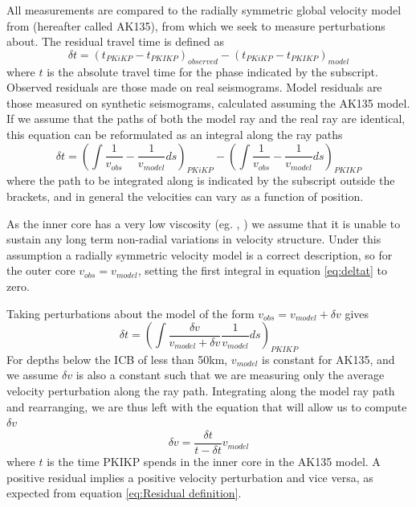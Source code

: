 \documentclass[11pt,a4paper]{article}
\begin{document}
All measurements are compared to the radially symmetric global velocity model from \cite{Kennett1995b} (hereafter called AK135), from which we seek to measure perturbations about. The residual travel time is defined as
\begin{equation}
	\delta t = \left ( t_{PKiKP} - t_{PKIKP} \right )_{observed} -  \left ( t_{PKiKP} - t_{PKIKP} \right )_{model}
	\label{eq:Residual definition}
\end{equation}
where $t$ is the absolute travel time for the phase indicated by the subscript. Observed residuals are those made on real seismograms. Model residuals are those measured on synthetic seismograms, calculated assuming the AK135 model. If we assume that the paths of both the model ray and the real ray are identical, this equation can be reformulated as an integral along the ray paths
\begin{equation}
		\delta t = \left (  \int \frac{1}{v_{obs}} - \frac{1}{v_{model}} ds  \right )_{PKiKP} - \left (  \int \frac{1}{v_{obs}} - \frac{1}{v_{model}} ds \right )_{PKIKP}
		\label{eq:deltat}
\end{equation}
where the path to be integrated along is indicated by the subscript outside the brackets, and in general the velocities can vary as a function of position.

As the inner core has a very low viscosity (eg. \cite{Wijs1998}, \cite{Zhang2000}) we assume that it is unable to sustain any long term non-radial variations in velocity structure. Under this assumption a radially symmetric velocity model is a correct description, so for the outer core $v_{obs} = v_{model}$, setting the first integral in equation \eqref{eq:deltat} to zero.

Taking perturbations about the model of the form $v_{obs} = v_{model} + \delta v$ gives
\begin{equation}
	\delta t =\left ( \int \frac{\delta v}{v_{model} + \delta v }\frac{1}{v_{model}} ds \right )_{PKIKP}
\end{equation}
For depths below the ICB of less than 50km, $v_{model}$ is constant for AK135, and we assume $\delta v$ is also a constant such that we are measuring only the average velocity perturbation along the ray path. Integrating along the model ray path and rearranging, we are thus left with the equation that will allow us to compute $\delta v$
\begin{equation}
	\delta v = \frac{\delta t}{t - \delta t} v_{model}
	\label{eq:Delta v}
\end{equation}
where $t$ is the time PKIKP spends in the inner core in the AK135 model. A positive residual implies a positive velocity perturbation and vice versa, as expected from equation \eqref{eq:Residual definition}.
\end{document}
